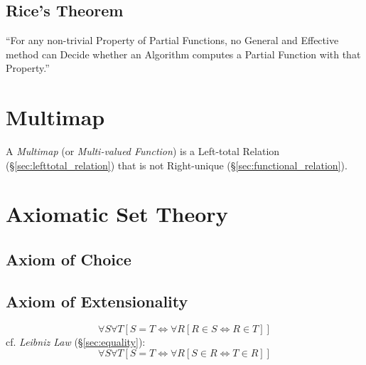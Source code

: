 \subsection{Rice's Theorem}\label{sec:rices_theorem}

``For any non-trivial Property of Partial Functions, no General and
Effective method can Decide whether an Algorithm computes a Partial
Function with that Property.''



\section{Multimap}\label{sec:multimap}

A \emph{Multimap} (or \emph{Multi-valued Function}) is a Left-total
Relation (\S\ref{sec:lefttotal_relation}) that is not Right-unique
(\S\ref{sec:functional_relation}).



\section{Axiomatic Set Theory}\label{sec:axiomatic_set_theory}

\subsection{Axiom of Choice}\label{sec:choice_axiom}

\subsection{Axiom of Extensionality}\label{sec:extensionality_axiom}
\[
  \forall S \forall T
    [S = T \Leftrightarrow \forall R [ R \in S \Leftrightarrow R \in T ]]
\]
cf. \emph{Leibniz Law} (\S\ref{sec:equality}):
\[
  \forall S \forall T
    [S = T \Leftrightarrow \forall R [ S \in R \Leftrightarrow T \in R ]]
\]

